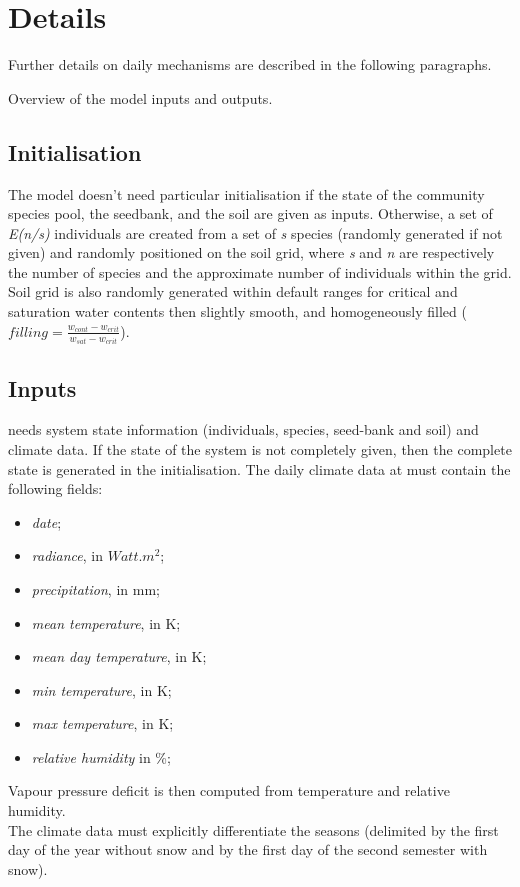 \section{Details}

Further details on daily mechanisms are described in the following paragraphs.


\begin{marginfigure}
\caption{Overview of the model inputs and outputs.}
\end{marginfigure}

\subsection{Initialisation}
The model doesn't need particular initialisation if the state of the community species pool, the seedbank, and the soil are given as inputs. Otherwise, a set of \textit{E(n/s)} individuals are created from a set of \textit{s} species (randomly generated if not given) and randomly positioned on the soil grid, where \textit{s} and \textit{n} are respectively the number of species and the approximate number of individuals within the grid. Soil grid is also randomly generated within default ranges for critical and saturation water contents then slightly smooth, and homogeneously filled ($filling = \frac{w_{cont} - w_{crit}}{w_{sat} - w_{crit}}$).
 
\subsection{Inputs}
\model needs system state information (individuals, species, seed-bank and soil) and climate data. If the state of the system is not completely given, then the complete state is generated in the initialisation. The daily climate data at must contain the following fields:
\begin{itemize}
\setlength\itemsep{0em}
\item \textit{date};
\item \textit{radiance}, in $Watt.m^{2}$;
\item \textit{precipitation}, in mm;
\item \textit{mean temperature}, in K;
\item \textit{mean day temperature}, in K;
\item \textit{min temperature}, in K;
\item \textit{max temperature}, in K;
\item \textit{relative humidity} in \%;
\end{itemize}
Vapour pressure deficit is then computed from temperature and relative humidity.\\
\indent The climate data must explicitly differentiate the seasons (delimited by the first day of the year without snow and by the first day of the second semester with snow).

